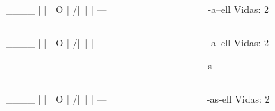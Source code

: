 \documentclass[spanish]{beamer}
\begin{document}

\begin{frame}[fragile]
  \begin{columns}[onlytextwidth,T]
    \begin{column}{.5\textwidth}
        \begin{code}
  ____
  |  |
  |  O
  | /|\
  |
  |
 ---
        \end{code}
    \end{column}
    \begin{column}{.5\textwidth}
      \begin{code}


 -a--ell          Vidas: 2




      \end{code}
    \end{column}
  \end{columns}
\end{frame}


\begin{frame}[fragile]
  \begin{columns}[onlytextwidth,T]
    \begin{column}{.5\textwidth}
        \begin{code}
  ____
  |  |
  |  O
  | /|\
  |
  |
 ---
        \end{code}
    \end{column}
    \begin{column}{.5\textwidth}
      \begin{code}


 -a--ell          Vidas: 2

 s


      \end{code}
    \end{column}
  \end{columns}
\end{frame}


\begin{frame}[fragile]
  \begin{columns}[onlytextwidth,T]
    \begin{column}{.5\textwidth}
        \begin{code}
  ____
  |  |
  |  O
  | /|\
  |
  |
 ---
        \end{code}
    \end{column}
    \begin{column}{.5\textwidth}
      \begin{code}


 -as-ell          Vidas: 2




      \end{code}
    \end{column}
  \end{columns}
\end{frame}
\end{document}
